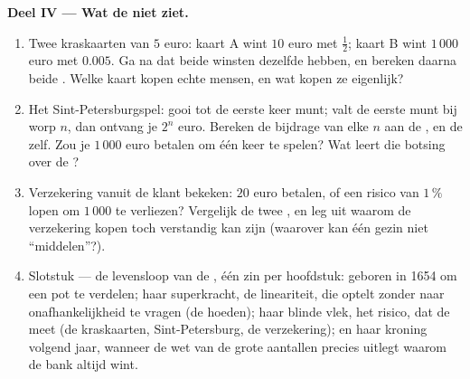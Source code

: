 \begin{problem}
\medskip
\noindent\textbf{Deel IV --- Wat de  niet ziet.}
\begin{enumerate}[resume]
  \item Twee kraskaarten van $5$ euro: kaart A wint $10$ euro met 
        $\frac12$; kaart B wint $1\,000$ euro met  $0.005$. Ga na dat
        beide winsten dezelfde  hebben, en bereken daarna
        beide . Welke kaart kopen echte mensen, en wat kopen ze
        eigenlijk?
  \item Het Sint-Petersburgspel: gooi tot de eerste keer munt; valt de eerste
        munt bij worp $n$, dan ontvang je $2^n$ euro. Bereken de bijdrage van
        elke $n$ aan de , en de  zelf.
        Zou je $1\,000$ euro betalen om één keer te spelen? Wat leert die
        botsing over de ?
  \item Verzekering vanuit de klant bekeken: $20$ euro betalen, of een risico
        van $1\,\%$ lopen om $1\,000$ te verliezen? Vergelijk de twee
        , en leg uit waarom de verzekering kopen toch
        verstandig kan zijn (waarover kan één gezin niet ``middelen''?).
  \item Slotstuk --- de levensloop van de , één zin per
        hoofdstuk: geboren in 1654 om een pot te verdelen; haar superkracht,
        de lineariteit, die  optelt zonder naar
        onafhankelijkheid te vragen (de hoeden); haar blinde vlek, het
        risico, dat de  meet (de kraskaarten, Sint-Petersburg, de
        verzekering); en haar kroning volgend jaar, wanneer de wet van de
        grote aantallen precies uitlegt waarom de bank altijd wint.
\end{enumerate}
\end{problem}
